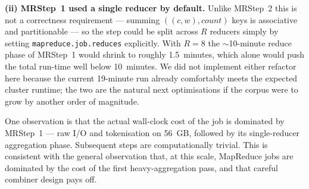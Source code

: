 \documentclass[11pt,a4paper]{article}
\begin{document}
\textbf{(ii) MRStep~1 used a single reducer by default.} Unlike MRStep~2
this is not a correctness requirement --- summing $((c,w),\textit{count})$
keys is associative and partitionable --- so the step could be split
across $R$ reducers simply by setting \texttt{mapreduce.job.reduces}
explicitly. With $R = 8$ the $\sim$10-minute reduce phase of MRStep~1
would shrink to roughly 1.5~minutes, which alone would push the total
run-time well below 10~minutes. We did not implement either refactor
here because the current 19-minute run already comfortably meets the
expected cluster runtime; the two are the natural next optimisations if
the corpus were to grow by another order of magnitude.

One observation is that the actual wall-clock cost of the
job is dominated by MRStep~1 --- raw I/O and tokenisation on 56~GB,
followed by its single-reducer aggregation phase. Subsequent steps are
computationally trivial. This is consistent with the general observation
that, at this scale, MapReduce jobs are dominated by the cost of the
first heavy-aggregation pass, and that careful combiner design pays off.
\end{document}
